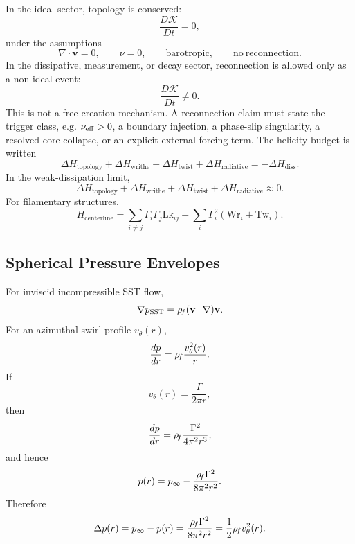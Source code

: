         In the ideal sector, topology is conserved:
        \[
            \frac{D\mathcal K}{Dt}=0,
        \]
        under the assumptions
        \[
            \nabla\cdot\mathbf v=0,
            \qquad
            \nu=0,
            \qquad
            \mathrm{barotropic},
            \qquad
            \mathrm{no\ reconnection}.
        \]
        In the dissipative, measurement, or decay sector, reconnection is allowed only as a non-ideal event:
        \[
            \frac{D\mathcal K}{Dt}\neq0.
        \]
        This is not a free creation mechanism. A reconnection claim must state the trigger class, e.g. \(\nu_{\rm eff}>0\), a boundary injection, a phase-slip singularity, a resolved-core collapse, or an explicit external forcing term.
        The helicity budget is written
        \[
            \Delta H_{\mathrm{topology}}
            +
            \Delta H_{\mathrm{writhe}}
            +
            \Delta H_{\mathrm{twist}}
            +
            \Delta H_{\mathrm{radiative}}
            =
            -\Delta H_{\mathrm{diss}}.
        \]
        In the weak-dissipation limit,
        \[
            \Delta H_{\mathrm{topology}}
            +
            \Delta H_{\mathrm{writhe}}
            +
            \Delta H_{\mathrm{twist}}
            +
            \Delta H_{\mathrm{radiative}}
            \approx
            0.
        \]
        For filamentary structures,
        \[
            H_{\mathrm{centerline}}
            =
            \sum_{i\neq j}
            \Gamma_i\Gamma_j\mathrm{Lk}_{ij}
            +
            \sum_i
            \Gamma_i^2
            \left(
                \mathrm{Wr}_i+\mathrm{Tw}_i
            \right).
        \]
    
    \subsection{Spherical Pressure Envelopes}
        
        For inviscid incompressible SST flow,
        \[
            \nabla p_{\mathrm{SST}}
            =
            \rho_{\!f}(\mathbf v\cdot\nabla)\mathbf v .
        \]
        For an azimuthal swirl profile \(v_\theta(r)\),
        \[
            \frac{dp}{dr}
            =
            \rho_{\!f}\frac{v_\theta^2(r)}{r}.
        \]
        If
        \[
            v_\theta(r)=\frac{\Gamma}{2\pi r},
        \]
        then
        \[
            \frac{dp}{dr}
            =
            \rho_{\!f}\frac{\Gamma^2}{4\pi^2r^3},
        \]
        and hence
        \[
            p(r)
            =
            p_\infty
            -
            \frac{\rho_{\!f}\Gamma^2}{8\pi^2r^2}.
        \]
        Therefore
        \[
            \Delta p(r)
            =
            p_\infty-p(r)
            =
            \frac{\rho_{\!f}\Gamma^2}{8\pi^2r^2}
            =
            \frac{1}{2}\rho_{\!f} v_\theta^2(r).
        \]
        
